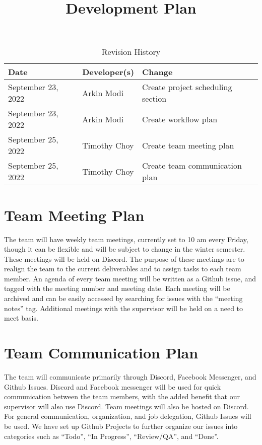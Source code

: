 \documentclass{article}
\title{Development Plan\\\progname}
\author{\authname}
\date{}
\begin{document}
\begin{table}[hp]
\caption{Revision History} \label{TblRevisionHistory}
\begin{tabularx}{\textwidth}{llX}
\toprule
\textbf{Date} & \textbf{Developer(s)} & \textbf{Change}\\
\midrule
September 23, 2022 & Arkin Modi & Create project scheduling section\\
September 23, 2022 & Arkin Modi & Create workflow plan\\
September 25, 2022 & Timothy Choy & Create team meeting plan \\
September 25, 2022 & Timothy Choy & Create team communication plan \\
\bottomrule
\end{tabularx}
\end{table}

\newpage

\maketitle


\section{Team Meeting Plan}

The team will have weekly team meetings, currently set to 10 am every Friday, though it can be 
flexible and will be subject to change in the winter semester. These meetings will be held on 
Discord. The purpose of these meetings are to realign the team to the current deliverables and to 
assign tasks to each team member. An agenda of every team meeting will be written as a Github 
issue, and tagged with the meeting number and meeting date. Each meeting will be archived and can 
be easily accessed by searching for issues with the ``meeting notes'' tag. Additional meetings with 
the supervisor will be held on a need to meet basis.

\section{Team Communication Plan}

The team will communicate primarily through Discord, Facebook Messenger, and Github Issues. Discord 
and Facebook messenger will be used for quick communication between the team members, with the added 
benefit that our supervisor will also use Discord. Team meetings will also be hosted on Discord. For 
general communication, organization, and job delegation, Github Issues will be used. We have set up 
Github Projects to further organize our issues into categories such as ``Todo'', ``In Progress'', 
``Review/QA'', and ``Done''.
\end{document}
